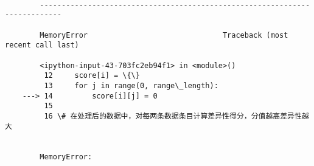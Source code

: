 \documentclass[11pt]{article}
\begin{document}
    \begin{Verbatim}[commandchars=\\\{\}]

        ---------------------------------------------------------------------------

        MemoryError                               Traceback (most recent call last)

        <ipython-input-43-703fc2eb94f1> in <module>()
         12     score[i] = \{\}
         13     for j in range(0, range\_length):
    ---> 14         score[i][j] = 0
         15 
         16 \# 在处理后的数据中，对每两条数据条目计算差异性得分，分值越高差异性越大
    

        MemoryError: 

    \end{Verbatim}


    
    
    
    
\end{document}
